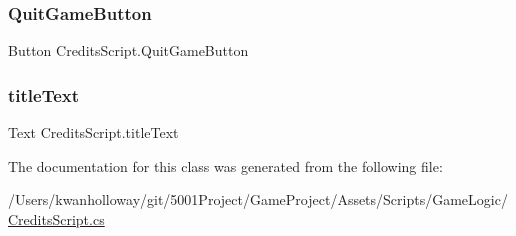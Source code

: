 \subsubsection{\texorpdfstring{Quit\+Game\+Button}{QuitGameButton}}
{\footnotesize\ttfamily Button Credits\+Script.\+Quit\+Game\+Button}

\mbox{\label{class_credits_script_a82dd5ac0339aa56110dd0e0950a0c4c5}} 
\subsubsection{\texorpdfstring{title\+Text}{titleText}}
{\footnotesize\ttfamily Text Credits\+Script.\+title\+Text}



The documentation for this class was generated from the following file\+:\begin{DoxyCompactItemize}
\item 
/\+Users/kwanholloway/git/5001\+Project/\+Game\+Project/\+Assets/\+Scripts/\+Game\+Logic/\hyperlink{_credits_script_8cs}{Credits\+Script.\+cs}\end{DoxyCompactItemize}
